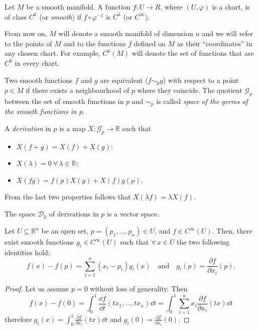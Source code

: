 \documentclass[a4paper,12pt]{book}
\begin{document}
\begin{definition}
Let $M$ be a smooth manifold. A function $f\colon U\to R$, where $(U,\varphi)$ is a chart, is of class $C^k$ (or \emph{smooth}) if $f\circ\varphi^{-1}$ is $C^k$ (or $C^\infty$).
\end{definition}

From now on, $M$ will denote a smooth manifold of dimension $n$ and we will refer to the points of $M$ and to the functions $f$ defined on $M$ as their ``coordinates'' in any chosen chart. For example, $C^k(M)$ will denote the set of functions that are $C^k$ in every chart.

\begin{definition}
Two smooth functions $f$ and $g$ are equivalent ($f\sim_p g$) with respect to a point $p\in M$ if there exists a neighbourhood of $p$ where they coincide. The quotient $\mathcal G_p$ between the set of smooth functions in $p$ and $\sim_p$ is called \emph{space of the germs of the smooth functions in $p$}.
\end{definition}

\begin{definition}
A \emph{derivation} in $p$ is a map $X\colon \mathcal G_p\to\mathbb R$ such that
\begin{itemize}
\item $X(f+g)=X(f)+X(g)$;
\item $X(\lambda)=0\ \forall\,\lambda\in\mathbb R$;
\item $X(fg)=f(p)X(g)+X(f)g(p)$.
\end{itemize}
From the last two properties follows that $X(\lambda f)=\lambda X(f)$.
\end{definition}
The space $\mathcal D_p$ of derivations in $p$ is a vector space.

\begin{lemma}
\label{lemma:smooth}
Let $U\subseteq\mathbb R^n$ be an open set, $p=(p_1,\ldots,p_n)\in U$, and $f\in C^\infty(U)$. Then, there exist smooth functions $g_i\in C^\infty(U)$ such that $\forall\, x\in U$ the two following identities hold:
\[f(x)-f(p)=\sum_{i=1}^n(x_i-p_i)g_i(x)\quad\text{and}\quad g_i(p)=\frac{\partial f}{\partial x_i}(p).\]
\end{lemma}
\begin{proof}
Let us assume $p=0$ without loss of generality. Then
\[f(x)-f(0)=\int_0^1\frac{\dd f}{\dd t}(tx_1,\ldots,tx_n)\dd t=\int_0^1\sum_{i=1}^nx_i\frac{\partial f}{\partial x_i}(tx)\dd t\]
therefore $g_i(x)=\int_0^1\frac{\partial f}{\partial x_i}(tx)\dd t$ and $g_i(0)=\frac{\partial f}{\partial x_i}(0)$.
\end{proof}
\end{document}
